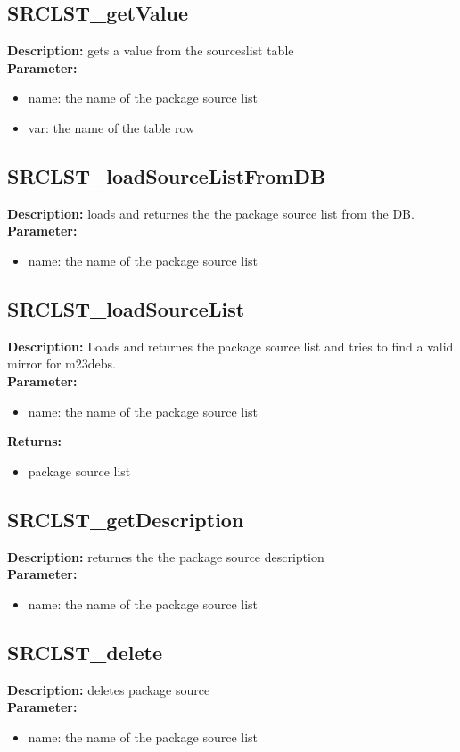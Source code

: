 \subsection{SRCLST\_getValue}
\textbf{Description:} gets a value from the sourceslist table\\
\textbf{Parameter:}
\begin{itemize}
\item name: the name of the package source list
\item var: the name of the table row
\end{itemize}

\subsection{SRCLST\_loadSourceListFromDB}
\textbf{Description:} loads and returnes the the package source list from the DB.\\
\textbf{Parameter:}
\begin{itemize}
\item name: the name of the package source list
\end{itemize}

\subsection{SRCLST\_loadSourceList}
\textbf{Description:} Loads and returnes the package source list and tries to find a valid mirror for m23debs.\\
\textbf{Parameter:}
\begin{itemize}
\item name: the name of the package source list
\end{itemize}
\textbf{Returns:}
\begin{itemize}
\item package source list
\end{itemize}

\subsection{SRCLST\_getDescription}
\textbf{Description:} returnes the the package source description\\
\textbf{Parameter:}
\begin{itemize}
\item name: the name of the package source list
\end{itemize}

\subsection{SRCLST\_delete}
\textbf{Description:} deletes package source\\
\textbf{Parameter:}
\begin{itemize}
\item name: the name of the package source list
\end{itemize}

